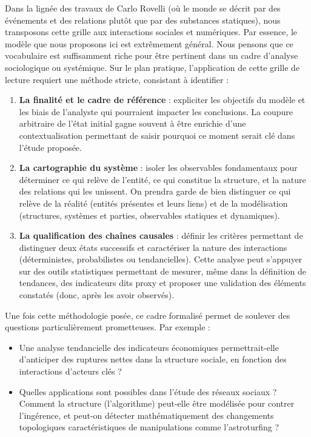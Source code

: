 \documentclass[11pt]{article}
\begin{document}
	Dans la lignée des travaux de Carlo Rovelli (où le monde se décrit par des événements et des relations plutôt que par des substances statiques), nous transposons cette grille aux interactions sociales et numériques. Par essence, le modèle que nous proposons ici est extrêmement général. Nous pensons que ce vocabulaire est suffisamment riche pour être pertinent dans un cadre d'analyse sociologique ou systémique. Sur le plan pratique, l'application de cette grille de lecture requiert une méthode stricte, consistant à identifier :
	
	\begin{enumerate}
		\item \textbf{La finalité et le cadre de référence} : expliciter les objectifs du modèle et les biais de l'analyste qui pourraient impacter les conclusions. La coupure arbitraire de l'état initial gagne souvent à être enrichie d'une contextualisation permettant de saisir pourquoi ce moment serait clé dans l'étude proposée. 
		\item \textbf{La cartographie du système} : isoler les observables fondamentaux pour déterminer ce qui relève de l'entité, ce qui constitue la structure, et la nature des relations qui les unissent. On prendra garde de bien distinguer ce qui relève de la réalité (entités présentes et leurs liens) et de la modélisation (structures, systèmes et parties, observables statiques et dynamiques). 
		\item \textbf{La qualification des chaînes causales} : définir les critères permettant de distinguer deux états successifs et caractériser la nature des interactions (déterministes, probabilistes ou tendancielles). Cette analyse peut s'appuyer sur des outils statistiques permettant de mesurer, même dans la définition de tendances, des indicateurs dits \og{}proxy\fg{} et proposer une validation des éléments constatés (donc, après les avoir observés). 
	\end{enumerate}
	
	
	Une fois cette méthodologie posée, ce cadre formalisé permet de soulever des questions particulièrement prometteuses. Par exemple :
	\begin{itemize}
		\item Une analyse tendancielle des indicateurs économiques permettrait-elle d'anticiper des ruptures nettes dans la structure sociale, en fonction des interactions d'acteurs clés ?
		\item Quelles applications sont possibles dans l'étude des réseaux sociaux ? Comment la structure (l'algorithme) peut-elle être modélisée pour contrer l'ingérence, et peut-on détecter mathématiquement des changements topologiques caractéristiques de manipulations comme l'astroturfing ?
	\end{itemize}
	
	
	
\end{document}
